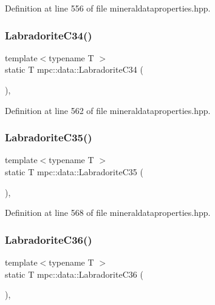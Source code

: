 Definition at line 556 of file mineraldataproperties.\+hpp.

\mbox{\label{namespacempc_1_1data_aab7321917ad0dc7ba5c6091a4145e902}} 
\subsubsection{\texorpdfstring{Labradorite\+C34()}{LabradoriteC34()}}
{\footnotesize\ttfamily template$<$typename T $>$ \\
static T mpc\+::data\+::\+Labradorite\+C34 (\begin{DoxyParamCaption}{ }\end{DoxyParamCaption})\hspace{0.3cm}{\ttfamily [inline]}, {\ttfamily [static]}}



Definition at line 562 of file mineraldataproperties.\+hpp.

\mbox{\label{namespacempc_1_1data_a9f2c1af322f673b8ef0b8e294329962c}} 
\subsubsection{\texorpdfstring{Labradorite\+C35()}{LabradoriteC35()}}
{\footnotesize\ttfamily template$<$typename T $>$ \\
static T mpc\+::data\+::\+Labradorite\+C35 (\begin{DoxyParamCaption}{ }\end{DoxyParamCaption})\hspace{0.3cm}{\ttfamily [inline]}, {\ttfamily [static]}}



Definition at line 568 of file mineraldataproperties.\+hpp.

\mbox{\label{namespacempc_1_1data_a9c1b33c104dec4353af014a027e75725}} 
\subsubsection{\texorpdfstring{Labradorite\+C36()}{LabradoriteC36()}}
{\footnotesize\ttfamily template$<$typename T $>$ \\
static T mpc\+::data\+::\+Labradorite\+C36 (\begin{DoxyParamCaption}{ }\end{DoxyParamCaption})\hspace{0.3cm}{\ttfamily [inline]}, {\ttfamily [static]}}



